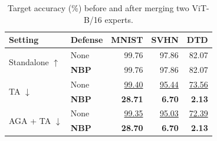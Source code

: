 \begin{table}[!htbp]
\centering
\small
\setlength{\tabcolsep}{4pt}
\caption{Target accuracy (\%) before and after merging two ViT-B/16 experts.}
\label{tab:backbone}
\begin{tabular}{llrrr}
\toprule
Setting & Defense & MNIST & SVHN & DTD \\
\midrule
\multirow{2}{*}{Standalone $\uparrow$} & None & 99.76 & 97.86 & 82.07 \\
 & \textbf{NBP} & 99.76 & 97.86 & 82.07 \\
\midrule
\multirow{2}{*}{TA $\downarrow$} & None & \underline{99.40} & \underline{95.44} & \underline{73.56} \\
 & \textbf{NBP} & \textbf{28.71} & \textbf{6.70} & \textbf{2.13} \\
\midrule
\multirow{2}{*}{AGA + TA $\downarrow$} & None & \underline{99.35} & \underline{95.03} & \underline{72.39} \\
 & \textbf{NBP} & \textbf{28.70} & \textbf{6.70} & \textbf{2.13} \\
\bottomrule
\end{tabular}
\end{table}
